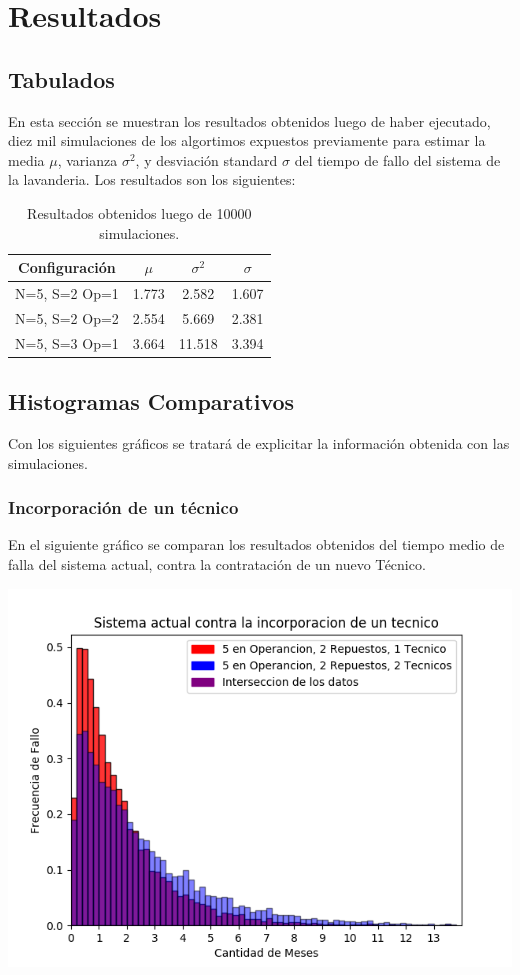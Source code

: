 \documentclass[11pt, spanish, a4paper]{article}
\begin{document}
\pagebreak
\section{Resultados}
\subsection{Tabulados}
En esta secci\'on se muestran los resultados obtenidos luego de haber ejecutado, diez mil simulaciones de los algortimos expuestos previamente para estimar la media $\mu$, varianza $\sigma^2$, y desviaci\'on standard $\sigma$ del tiempo de fallo del sistema de la lavanderia. Los resultados son los siguientes:

\begin{table}[htbp]
\begin{center}
\begin{tabular}{|c|c|c|c|}
\hline
\textbf{  Configuraci\'on }  &  \textbf{$\mu$}  & \textbf{$\sigma^2$} & \textbf{$\sigma$}\\
\hline
N=5, S=2 Op=1 & 1.773 & 2.582 & 1.607 \\ \hline
N=5, S=2 Op=2 & 2.554 & 5.669 & 2.381 \\ \hline
N=5, S=3 Op=1 & 3.664 & 11.518 & 3.394 \\ \hline
\end{tabular}
\caption{Resultados obtenidos luego de 10000 simulaciones.}
\label{tabla:resultados}
\end{center}
\end{table}

\subsection{Histogramas Comparativos}
Con los siguientes gr\'aficos se tratar\'a de explicitar la informaci\'on obtenida con las simulaciones.
\smallbreak

\subsubsection{Incorporaci\'on de un t\'ecnico}
En el siguiente gr\'afico se comparan los resultados obtenidos del tiempo medio de falla del sistema actual, contra la contrataci\'on de un nuevo T\'ecnico. 

\includegraphics{Figure_1}
\end{document}
